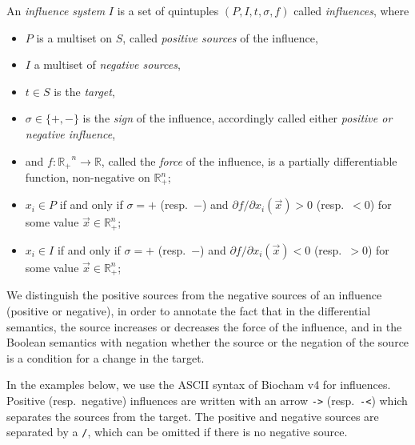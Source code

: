 \documentclass{llncs}
\begin{document}
\begin{definition}\cite{FMRS16cmsb}
An \emph{influence system}
   $I$ is a set of quintuples $(P, I, t, \sigma, f)$ called \emph{influences},
   where 
\begin{itemize}
\item $P$ is a multiset on $S$, called \emph{positive sources} of the influence, 
\item $I$ a multiset of \emph{negative sources}, 
\item $t\in S$ is the \emph{target},
\item $\sigma\in\{+,-\}$ is the \emph{sign} of the influence, accordingly called either \emph{positive or negative influence},
\item and $f:\mathbb{R_+}^n\to\mathbb{R}$, called the \emph{force} of the influence,
is a partially differentiable function, non-negative
   on $\mathbb{R}_+^n$;
\item $x_i\in P$ if and only if $\sigma = +$ (resp.\ $-$) and
   ${\partial {f}}/ {\partial x_i}(\vec x)>0$ (resp.\ $<0$) for some value
   $\vec x\in\mathbb{R}_+^n$;
\item $x_i\in I$ if and only if $\sigma = +$ (resp.\ $-$) and
   ${\partial {f}}/ {\partial x_i}(\vec x)<0$ (resp.\ $>0$) for some value
  $\vec x\in\mathbb{R}_+^n$;
\end{itemize}
\end{definition}

We distinguish the positive sources from the negative sources of an influence (positive or negative),
in order to annotate the fact that in the differential semantics,
the source increases or decreases the force of the influence,
and in the Boolean semantics with negation whether the source or the negation of the source
is a condition for a change in the target.

In the examples below, we use the ASCII syntax of Biocham v4 for influences.
Positive (resp.~negative) influences are written with an arrow \lstinline|->| (resp.~\lstinline+-<+)
which separates the sources from the target.
The positive and negative sources are separated
by a \lstinline|/|, which can be omitted if there is no negative source.
\end{document}
